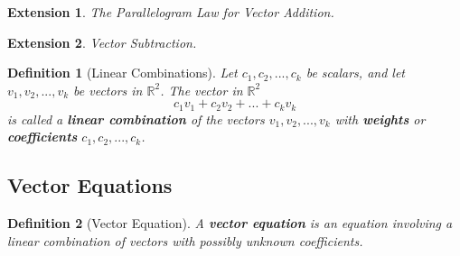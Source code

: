 \documentclass[12pt, a4paper]{article}
\newtheorem{df}{Definition}[subsection]
\newtheorem*{ext}{\indent Extension}
\def\R{{\mathbb{R}}}
\begin{document}
\begin{ext}The Parallelogram Law for Vector Addition.\end{ext}

\begin{ext}Vector Subtraction.\end{ext}

\begin{df}[Linear Combinations]
Let $c_1,c_2,...,c_k$ be scalars, and let $v_1,v_2,...,v_k$ be vectors in $\R^2$. The vector in $\R^2$ $$c_1v_1+c_2v_2+...+c_kv_k$$ is called a \textbf{linear combination} of the vectors $v_1,v_2,...,v_k$ with \textbf{weights} or \textbf{coefficients} $c_1,c_2,...,c_k$.
\end{df}

\subsection{Vector Equations}
\begin{df}[Vector Equation]
A \textbf{vector equation} is an equation involving a linear combination of vectors with possibly unknown coefficients.
\end{df}
\end{document}
